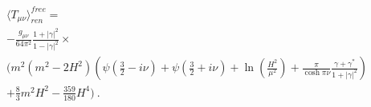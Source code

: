 \begin{equation}
\label{eq:set3} 
\begin{array}{l}
\langle T_{\mu\nu} \rangle_{ren}^{free} = \\
  - \frac{ g_{\mu\nu}}{64\pi^2}
  \frac{1+|\gamma|^2}{1-|\gamma|^2}\times \\
   \Big(
        m^2(m^2-2 H^2)
    \left(\psi\left(\tfrac{3}{2}-i\nu\right)+\psi\left(\tfrac{3}{2}+i\nu\right)
    +\ln\left(\frac{H^2}{\mu^2}\right)+\frac{\pi}{\cosh\pi\nu}\frac{\gamma+\gamma^*}{1+|\gamma|^2}
     \right) \\ 
   + \tfrac{8}{3}m^2 H^2-\tfrac{359}{180}H^4 \Big) ~.
\end{array}
\end{equation}

